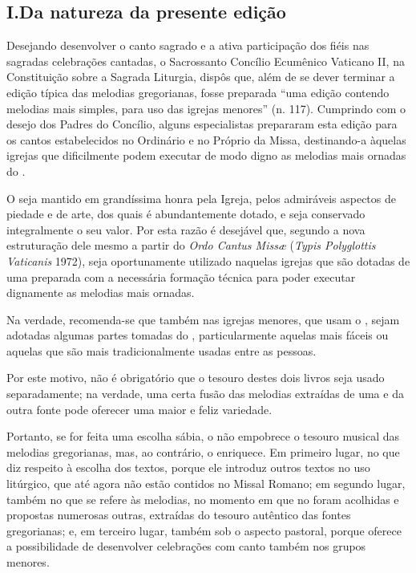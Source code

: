 \subsection{I.\@ Da natureza da presente edição}\label{subsection:praenotanda-1}

 Desejando desenvolver o canto sagrado e a ativa participação dos fiéis nas sagradas celebrações cantadas, o Sacrossanto Concílio Ecumênico Vaticano II, na Constituição sobre a Sagrada Liturgia, dispôs que, além de se dever terminar a edição típica das melodias gregorianas, fosse preparada ``uma edição contendo melodias mais simples, para uso das igrejas menores'' (n. 117). Cumprindo com o desejo dos Padres do Concílio, alguns especialistas prepararam esta edição para os cantos estabelecidos no  Ordinário e no Próprio da Missa, destinando-a àquelas igrejas que dificilmente podem executar de modo digno as melodias mais ornadas do {\GR}.

 O {\GR} seja mantido em grandíssima honra pela Igreja, pelos admiráveis aspectos de piedade e de arte, dos quais é abundantemente dotado, e seja conservado integralmente o seu valor. Por esta razão é desejável que, segundo a nova estruturação dele mesmo a partir do \emph{Ordo Cantus Missæ} (\emph{Typis Polyglottis Vaticanis} 1972), seja oportunamente utilizado naquelas igrejas que são dotadas de uma {\ScholaC} preparada com a necessária formação técnica para poder executar dignamente as melodias mais ornadas.

Na verdade, recomenda-se que também nas igrejas menores, que usam o {\GS}, sejam  adotadas algumas partes tomadas do {\GR}, particularmente aquelas mais fáceis ou aquelas que são mais tradicionalmente usadas entre as pessoas.

 Por este motivo, não é obrigatório que o tesouro destes dois livros seja usado separadamente; na verdade, uma certa fusão das melodias extraídas de uma e da outra fonte pode oferecer uma maior e feliz variedade.

 Portanto, se for feita uma escolha sábia, o {\GS} não empobrece o tesouro musical das melodias gregorianas, mas, ao contrário, o enriquece. Em primeiro lugar, no que diz respeito à escolha dos textos, porque ele introduz outros textos no uso litúrgico, que até agora não estão contidos no Missal Romano; em segundo lugar, também no que se refere às melodias, no momento em que no {\GS} foram acolhidas e propostas numerosas outras, extraídas do tesouro autêntico das fontes gregorianas; e, em terceiro lugar, também sob o aspecto pastoral, porque oferece a possibilidade de desenvolver celebrações com canto também nos grupos menores.

